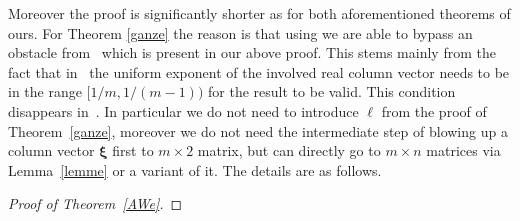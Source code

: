 \documentclass[10pt]{amsart}
\theoremstyle{definition}
\newcommand{\ux}{\boldsymbol{\xi}}
\begin{document}
 
 Moreover the proof is significantly shorter as for both aforementioned theorems of ours. 
 For Theorem \ref{ganze}
 the reason is that using \cite{AginWeiss2024} we are able to bypass an obstacle from~\cite{j1} which is present in our above proof. This stems mainly from the fact that in~\cite{j1} the uniform exponent of the involved real column vector needs to be in the range $[1/m,1/(m-1))$ for the result to be valid. This condition disappears in~\cite{AginWeiss2024}. In particular we do not need to introduce $\ell$ from the proof of Theorem~\ref{ganze}, moreover we do not need the intermediate step of blowing up a column vector $\ux$
 first to $m\times 2$ matrix, but can directly go to $m\times n$ matrices via Lemma~\ref{lemme} or a variant of it. The details are as follows.

 \begin{proof}[Proof of Theorem~\ref{AWe}]


\end{proof}
\end{document}
